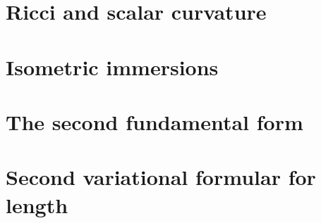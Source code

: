 \documentclass[letter-paper]{tufte-book}
\begin{document}
\section{Ricci and scalar curvature}


\section{Isometric immersions}


\section{The second fundamental form}


\section{Second variational formular for length}










\mainmatter




%


\end{document}
